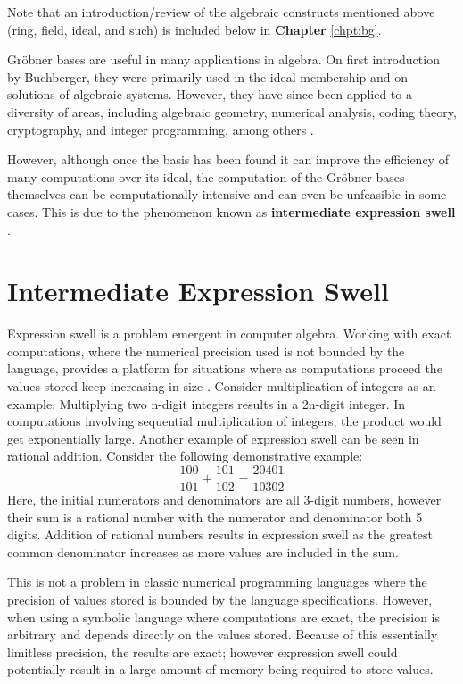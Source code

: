 \documentclass[letterpaper,12pt,titlepage,oneside,final]{book}
\begin{document}
Note that an introduction/review of the algebraic constructs mentioned above (ring, field, ideal, and such) is included below in \textbf{Chapter} \ref{chpt:bg}.    

Gr\"obner bases are useful in many applications in algebra.  On first introduction by Buchberger, they were primarily used in the ideal membership and on solutions of algebraic systems.  However, they have since been applied to a diversity of areas, including algebraic geometry, numerical analysis, coding theory, cryptography, and integer programming, among others \cite{Adams}.   

However, although once the basis has been found it can improve the efficiency of many computations over its ideal, the computation of the Gr\"obner bases themselves can be computationally intensive and can even be unfeasible in some cases.  This is due to the phenomenon known as \textbf{intermediate expression swell} \cite{Geddes}. 

\section{Intermediate Expression Swell}

Expression swell is a problem emergent in computer algebra.  Working with exact computations, where the numerical precision used is not bounded by the language, provides a platform for situations where as computations proceed the values stored keep increasing in size \cite{Geddes}.  Consider multiplication of integers as an example.  Multiplying two n-digit integers results in a 2n-digit integer.  In computations involving sequential multiplication of integers, the product would get exponentially large.  Another example of expression swell can be seen in rational addition. Consider the following demonstrative example:
\begin{equation*}
  \frac{100}{101} + \frac{101}{102} = \frac{20401}{10302}
\end{equation*}
Here, the initial numerators and denominators are all 3-digit numbers, however their sum is a rational number with the numerator and denominator both 5 digits.  Addition of rational numbers results in expression swell as the greatest common denominator increases as more values are included in the sum.

This is not a problem in classic numerical programming languages where the precision of values stored is bounded by the language specifications.  However, when using a symbolic language where computations are exact, the precision is arbitrary and depends directly on the values stored.  Because of this essentially limitless precision, the results are exact; however expression swell could potentially result in a large amount of memory being required to store values.
\end{document}
